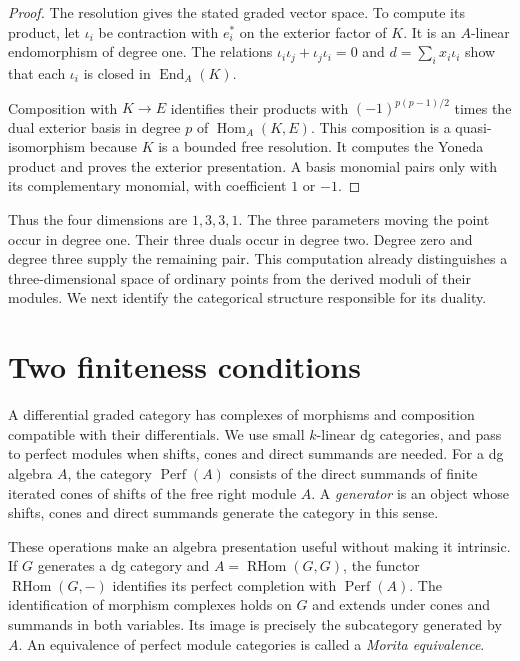 \begin{proof}
The resolution gives the stated graded vector space. To compute its
product, let $\iota_i$ be contraction with $e_i^*$ on the exterior factor
of $K$. It is an $A$-linear endomorphism of degree one.
The relations $\iota_i\iota_j+\iota_j\iota_i=0$ and
$d=\sum_i x_i\iota_i$ show that each $\iota_i$ is closed in
$\operatorname{End}_A(K)$.

Composition with $K\to E$ identifies their
products with $(-1)^{p(p-1)/2}$ times the dual exterior basis in degree $p$ of
$\operatorname{Hom}_A(K,E)$. This composition is a quasi-isomorphism
because $K$ is a bounded free resolution. It computes the Yoneda product
and proves the exterior presentation. A basis monomial pairs only with
its complementary monomial, with coefficient $1$ or $-1$.
\end{proof}

Thus the four dimensions are $1,3,3,1$. The three parameters moving the
point occur in degree one. Their three duals occur in degree two.
Degree zero and degree three supply the remaining pair. This computation
already distinguishes a three-dimensional space of ordinary points from
the derived moduli of their modules. We next identify the categorical
structure responsible for its duality.

\section{Two finiteness conditions}
\label{cygeom:sec:finiteness}

A differential graded category has complexes of morphisms and composition
compatible with their differentials. We use small $k$-linear dg categories,
and pass to perfect modules when shifts, cones and direct summands are
needed. For a dg algebra $A$, the category $\operatorname{Perf}(A)$ consists
of the direct summands of finite iterated cones of shifts of the free
right module $A$. A \emph{generator} is an object whose shifts, cones and
direct summands generate the category in this sense.

These operations make an algebra presentation useful without making it
intrinsic. If $G$ generates a dg category and
$A=\operatorname{RHom}(G,G)$, the functor
$\operatorname{RHom}(G,-)$ identifies its perfect completion with
$\operatorname{Perf}(A)$. The identification of morphism complexes
holds on $G$ and extends under cones and summands in both variables.
Its image is precisely the subcategory generated by $A$. An equivalence of
perfect module categories is called a \emph{Morita equivalence}.

